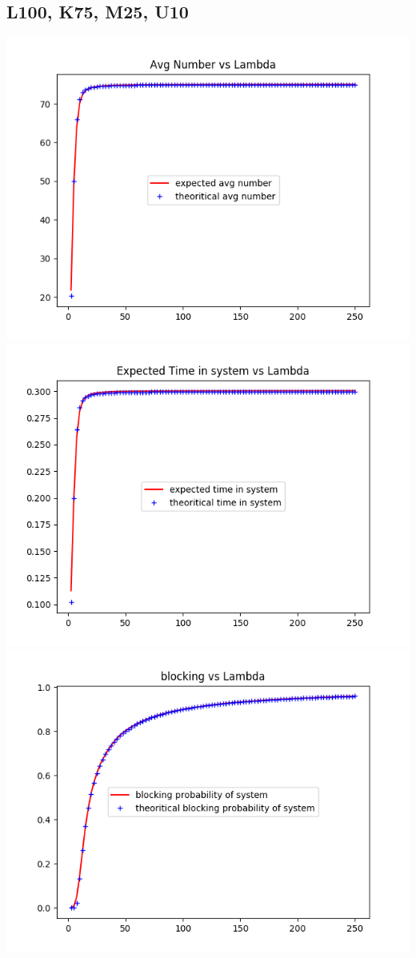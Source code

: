 \documentclass[11pt]{article}
\begin{document}
  \subsection{L100, K75, M25, U10}
 \includegraphics{ExpectedNumber_L100_K75_M25_U10}
  \includegraphics{ExpectedTime_L100_K75_M25_U10}
 \includegraphics{BlockingProbability_L100_K75_M25_U10}
\end{document}
